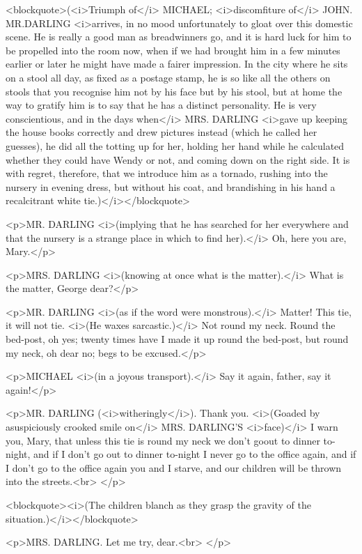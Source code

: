 <blockquote>(<i>Triumph of</i> MICHAEL; <i>discomfiture of</i> JOHN.
MR.DARLING <i>arrives, in no mood unfortunately to gloat over this
domestic scene. He is really a good man as breadwinners go, and it is
hard luck for him to be propelled into the room now, when if we had
brought him in a few minutes earlier or later he might have made a
fairer impression. In the city where he sits on a stool all day, as
fixed as a postage stamp, he is so like all the others on stools that
you recognise him not by his face but by his stool, but at home the
way to gratify him is to say that he has a distinct personality. He
is very conscientious, and in the days when</i> MRS. DARLING <i>gave
up keeping the house books correctly and drew pictures instead (which
he called her guesses), he did all the totting up for her, holding
her hand while he calculated whether they could have Wendy or not,
and coming down on the right side. It is with regret, therefore, that
we introduce him as a tornado, rushing into the nursery in evening
dress, but without his coat, and brandishing in his hand a
recalcitrant white tie.)</i></blockquote>

<p>MR. DARLING <i>(implying that he has searched for her everywhere
and that the nursery is a strange place in which to find her).</i>
Oh, here you are, Mary.</p>

<p>MRS. DARLING <i>(knowing at once what is the matter).</i> What is
the matter, George dear?</p>

<p>MR. DARLING <i>(as if the word were monstrous).</i> Matter! This
tie, it will not tie. <i>(He waxes sarcastic.)</i> Not round my neck.
Round the bed-post, oh yes; twenty times have I made it up round the
bed-post, but round my neck, oh dear no; begs to be excused.</p>

<p>MICHAEL <i>(in a joyous transport).</i> Say it again, father, say
it again!</p>

<p>MR. DARLING (<i>witheringly</i>). Thank you. <i>(Goaded by
asuspiciously crooked smile on</i> MRS. DARLING'S <i>face)</i> I warn
you, Mary, that unless this tie is round my neck we don't goout to
dinner to-night, and if I don't go out to dinner to-night I never go
to the office again, and if I don't go to the office again you and I
starve, and our children will be thrown into the streets.<br>
</p>

<blockquote><i>(The children blanch as they grasp the gravity of the
situation.)</i></blockquote>

<p>MRS. DARLING. Let me try, dear.<br>
</p>

